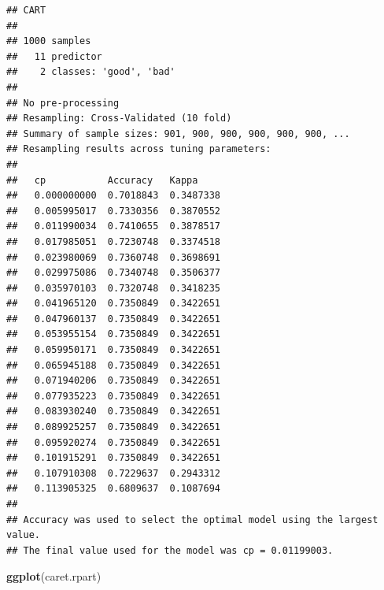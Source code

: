 \documentclass[]{book}
\newenvironment{Shaded}{\begin{snugshade}}{\end{snugshade}}
\newcommand{\KeywordTok}[1]{\textcolor[rgb]{0.13,0.29,0.53}{\textbf{#1}}}
\newcommand{\DataTypeTok}[1]{\textcolor[rgb]{0.13,0.29,0.53}{#1}}
\newcommand{\DecValTok}[1]{\textcolor[rgb]{0.00,0.00,0.81}{#1}}
\newcommand{\StringTok}[1]{\textcolor[rgb]{0.31,0.60,0.02}{#1}}
\newcommand{\CommentTok}[1]{\textcolor[rgb]{0.56,0.35,0.01}{\textit{#1}}}
\newcommand{\OperatorTok}[1]{\textcolor[rgb]{0.81,0.36,0.00}{\textbf{#1}}}
\newcommand{\NormalTok}[1]{#1}
\theoremstyle{break}
\theoremstyle{definition}
\theoremstyle{definition}
\theoremstyle{definition}
\theoremstyle{remark}
\begin{document}
\begin{Shaded}
\end{Shaded}

\begin{verbatim}
## CART 
## 
## 1000 samples
##   11 predictor
##    2 classes: 'good', 'bad' 
## 
## No pre-processing
## Resampling: Cross-Validated (10 fold) 
## Summary of sample sizes: 901, 900, 900, 900, 900, 900, ... 
## Resampling results across tuning parameters:
## 
##   cp           Accuracy   Kappa    
##   0.000000000  0.7018843  0.3487338
##   0.005995017  0.7330356  0.3870552
##   0.011990034  0.7410655  0.3878517
##   0.017985051  0.7230748  0.3374518
##   0.023980069  0.7360748  0.3698691
##   0.029975086  0.7340748  0.3506377
##   0.035970103  0.7320748  0.3418235
##   0.041965120  0.7350849  0.3422651
##   0.047960137  0.7350849  0.3422651
##   0.053955154  0.7350849  0.3422651
##   0.059950171  0.7350849  0.3422651
##   0.065945188  0.7350849  0.3422651
##   0.071940206  0.7350849  0.3422651
##   0.077935223  0.7350849  0.3422651
##   0.083930240  0.7350849  0.3422651
##   0.089925257  0.7350849  0.3422651
##   0.095920274  0.7350849  0.3422651
##   0.101915291  0.7350849  0.3422651
##   0.107910308  0.7229637  0.2943312
##   0.113905325  0.6809637  0.1087694
## 
## Accuracy was used to select the optimal model using the largest value.
## The final value used for the model was cp = 0.01199003.
\end{verbatim}

\begin{Shaded}
\begin{Highlighting}[]
\KeywordTok{ggplot}\NormalTok{(caret.rpart)}
\end{Highlighting}
\end{Shaded}
\end{document}
